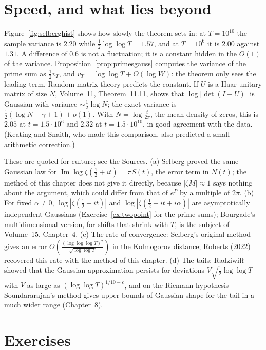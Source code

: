 \section{Speed, and what lies beyond}

Figure~\ref{fig:selberghist} shows how slowly the theorem sets in: at $T=10^{10}$ the sample variance is $2.20$ while $\frac12\log\log T=1.57$, and at $T=10^6$ it is $2.00$ against $1.31$. A difference of $0.6$ is not a fluctuation; it is a constant hidden in the $O(1)$ of the variance. Proposition~\ref{prop:primesgauss} computes the variance of the prime sum as $\frac12v_T$, and $v_T=\log\log T+O(\log W)$: the theorem only sees the leading term. Random matrix theory predicts the constant. If $U$ is a Haar unitary matrix of size $N$, Volume~11, Theorem~11.11, shows that $\log|\det(I-U)|$ is Gaussian with variance $\sim\frac12\log N$; the exact variance is $\frac12(\log N+\gamma+1)+o(1)$. With $N=\log\frac t{2\pi}$, the mean density of zeros, this is $2.05$ at $t=1.5\cdot10^6$ and $2.32$ at $t=1.5\cdot10^{10}$, in good agreement with the data. (Keating and Snaith, who made this comparison, also predicted a small arithmetic correction.)

\begin{remark}
These are quoted for culture; see the Sources. (a) Selberg proved the same Gaussian law for $\operatorname{Im}\log\zeta(\frac12+it)=\pi S(t)$, the error term in $N(t)$; the method of this chapter does not give it directly, because $|\zeta M|\approx1$ says nothing about the argument, which could differ from that of $e^P$ by a multiple of $2\pi$. (b) For fixed $\alpha\ne0$, $\log|\zeta(\frac12+it)|$ and $\log|\zeta(\frac12+it+i\alpha)|$ are asymptotically independent Gaussians (Exercise~\ref{ex:twopoint} for the prime sums); Bourgade's multidimensional version, for shifts that shrink with $T$, is the subject of Volume~15, Chapter~4. (c) The rate of convergence: Selberg's original method gives an error $O(\frac{(\log\log\log T)^2}{\sqrt{\log\log T}})$ in the Kolmogorov distance; Roberts (2022) recovered this rate with the method of this chapter. (d) The tails: Radziwi\l\l{} showed that the Gaussian approximation persists for deviations $V\sqrt{\frac12\log\log T}$ with $V$ as large as $(\log\log T)^{1/10-\varepsilon}$, and on the Riemann hypothesis Soundararajan's method gives upper bounds of Gaussian shape for the tail in a much wider range (Chapter~8).
\end{remark}

\section{Exercises}

